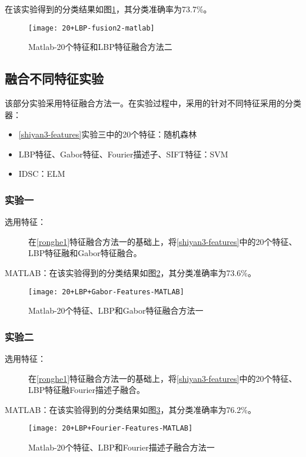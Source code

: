 在该实验得到的分类结果如图\ref{fig:20+LBP-fusion2-matlab}，其分类准确率为73.7\%。
\begin{figure}[!ht]
\centering
\texttt{[image: 20+LBP-fusion2-matlab]}
\caption{Matlab-20个特征和LBP特征融合方法二}
\label{fig:20+LBP-fusion2-matlab}
\end{figure}

\subsection{融合不同特征实验}
该部分实验采用特征融合方法一。在实验过程中，采用的针对不同特征采用的分类器：
\begin{itemize}
\item \ref{shiyan3-features}实验三中的20个特征：随机森林
\item LBP特征、Gabor特征、Fourier描述子、SIFT特征：SVM
\item IDSC：ELM
\end{itemize}
\subsubsection{实验一}
\begin{description}
\item[选用特征：] 在\ref{ronghe1}特征融合方法一的基础上，将\ref{shiyan3-features}中的20个特征、LBP特征融和Gabor特征融合。
\end{description}
MATLAB：在该实验得到的分类结果如图\ref{fig:20+LBP+Gabor-Features-MATLAB}，其分类准确率为73.6\%。
\begin{figure}[!ht]
\centering
\texttt{[image: 20+LBP+Gabor-Features-MATLAB]}
\caption{Matlab-20个特征、LBP和Gabor特征融合方法一}
\label{fig:20+LBP+Gabor-Features-MATLAB}
\end{figure}

\subsubsection{实验二}
\begin{description}
\item[选用特征：] 在\ref{ronghe1}特征融合方法一的基础上，将\ref{shiyan3-features}中的20个特征、LBP特征融Fourier描述子融合。
\end{description}
MATLAB：在该实验得到的分类结果如图\ref{fig:20+LBP+Fourier-Features-MATLAB}，其分类准确率为76.2\%。
\begin{figure}[!ht]
\centering
\texttt{[image: 20+LBP+Fourier-Features-MATLAB]}
\caption{Matlab-20个特征、LBP和Fourier描述子融合方法一}
\label{fig:20+LBP+Fourier-Features-MATLAB}
\end{figure}

